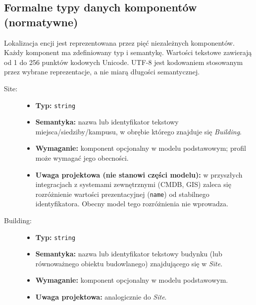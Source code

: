 \subsection{Formalne typy danych komponentów (normatywne)}
\label{sec:typy-danych}
Lokalizacja encji jest reprezentowana przez pięć niezależnych komponentów. Każdy komponent ma zdefiniowany typ i semantykę. Wartości tekstowe zawierają od 1 do 256 punktów kodowych Unicode. UTF-8 \cite{RFC3629} jest kodowaniem stosowanym przez wybrane reprezentacje, a nie miarą długości semantycznej.

\begin{description}
    \item[Site:]
    \begin{itemize}
        \item \textbf{Typ:} \texttt{string}
        \item \textbf{Semantyka:} nazwa lub identyfikator tekstowy miejsca/siedziby/kampusu, w obrębie którego znajduje się \textit{Building}.
        \item \textbf{Wymaganie:} komponent opcjonalny w modelu podstawowym; profil może wymagać jego obecności.
        \item \textbf{Uwaga projektowa (nie stanowi części modelu):} w przyszłych integracjach z systemami zewnętrznymi (CMDB, GIS) zaleca się rozróżnienie wartości prezentacyjnej (\texttt{name}) od stabilnego identyfikatora. Obecny model tego rozróżnienia nie wprowadza.
    \end{itemize}

    \item[Building:]
    \begin{itemize}
        \item \textbf{Typ:} \texttt{string}
        \item \textbf{Semantyka:} nazwa lub identyfikator tekstowy budynku (lub równoważnego obiektu budowlanego) znajdującego się w \textit{Site}.
        \item \textbf{Wymaganie:} komponent opcjonalny w modelu podstawowym.
        \item \textbf{Uwaga projektowa:} analogicznie do \textit{Site}.
    \end{itemize}


\end{description}
